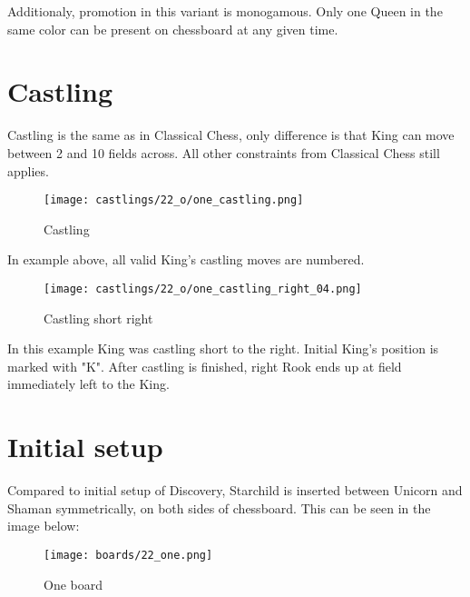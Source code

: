 Additionaly, promotion in this variant is monogamous.
Only one Queen in the same color can be present on chessboard at any given time.


\section*{Castling}

Castling is the same as in Classical Chess, only difference is that King can move between 2 and 10 fields across.
All other constraints from Classical Chess still applies.

\noindent
\begin{figure}[!h]
\texttt{[image: castlings/22\_o/one\_castling.png]}
\caption{Castling}
\label{fig:one_castling}
\end{figure}

In example above, all valid King's castling moves are numbered.

\noindent
\begin{figure}[!h]
\texttt{[image: castlings/22\_o/one\_castling\_right\_04.png]}
\caption{Castling short right}
\label{fig:one_castling_right_04}
\end{figure}

In this example King was castling short to the right. Initial King's position is marked with "K".
After castling is finished, right Rook ends up at field immediately left to the King.

\clearpage %

\section*{Initial setup}

Compared to initial setup of Discovery, Starchild is inserted between Unicorn and Shaman
symmetrically, on both sides of chessboard. This can be seen in the image below:

\noindent
\begin{figure}[h]
\texttt{[image: boards/22\_one.png]}
\caption{One board}
\label{fig:22_one}
\end{figure}

\clearpage %
